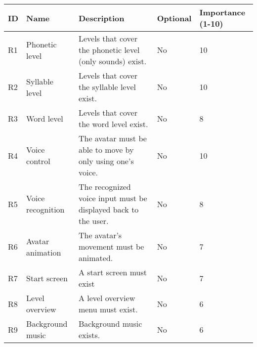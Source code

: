 \documentclass[draft,final]{vutinfth} %
\begin{document}
\begin{longtable}[h]{|p{}|p{}|p{}|p{}|p{}|}
\hline
\textbf{ID} & \textbf{Name} &  \textbf{Description} & \textbf{Optional}  & \textbf{Importance (1-10)}\\ \hline
R1 & Phonetic level &  Levels that cover the phonetic level (only sounds) exist. & No &10 \\ \hline
R2 & Syllable level &  Levels that cover the syllable level exist. & No &10 \\ \hline
R3 & Word level &  Levels that cover the word level exist. & No & 8 \\ \hline
R4 & Voice control &  The avatar must be able to move by only using one's voice. & No & 10 \\ \hline
R5 & Voice recognition &  The recognized voice input must be displayed back to the user. & No & 8 \\ \hline
R6 & Avatar animation &  The avatar's movement must be animated. & No &7 \\ \hline
R7 & Start screen &  A start screen must exist & No & 7 \\ \hline

R8 & Level overview &  A level overview menu must exist. & No & 6 \\ \hline

R9 & Background music &  Background music exists. & No & 6 \\ \hline


\end{longtable}
\end{document}
